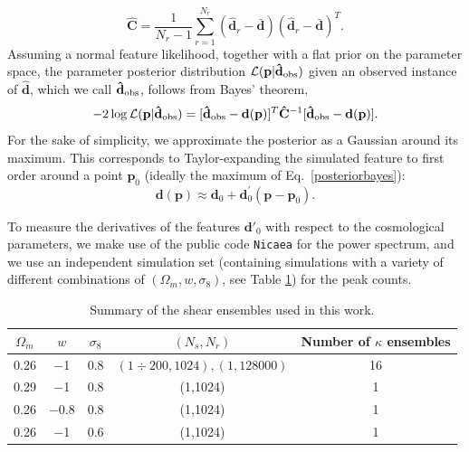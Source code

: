 \documentclass[reprint,aps,prd,superscriptaddress,showkeys,showpacs]{revtex4-1}
\newcommand{\bb}[1]{\mathbf{#1}}
\newcommand{\bbh}[1]{\mathbf{\hat{#1}}}
\begin{document}
\begin{equation}
\label{covest}
\bbh{C} = \frac{1}{N_r-1}\sum_{r=1}^{N_r} (\bbh{d}_r - \bar{\bb{d}}) (\bbh{d}_r - \bar{\bb{d}})^T.
\end{equation}
%
Assuming a normal feature likelihood, together with a flat prior on
the parameter space, the parameter posterior distribution
$\mathcal{L}(\bb{p}\vert\bbh{d}_{\rm obs})$ given an observed instance of
$\bbh{d}$, which we call $\bbh{d}_{\rm obs}$, follows from Bayes' theorem,
%
\begin{equation}
\label{posteriorbayes}
-2\log\mathcal{L}(\bb{p}\vert\bbh{d}_{\rm obs}) = [\bbh{d}_{\rm obs}-\bb{d}(\bb{p})]^T\bbh{C}^{-1}[\bbh{d}_{\rm obs}-\bb{d}(\bb{p})].
\end{equation}
%
For the sake of simplicity, we approximate the posterior as a Gaussian
around its maximum. This corresponds to Taylor-expanding the simulated
feature to first order around a point $\bb{p}_0$ (ideally the maximum
of Eq.~\ref{posteriorbayes}):
%
\begin{equation}
\bb{d}(\bb{p}) \approx \bb{d}_0 + \bb{d}_0^\prime(\bb{p}-\bb{p}_0).
\end{equation}
%

To measure the derivatives of the features $\bb{d}'_0$ with respect to
the cosmological parameters, we make use of the public code
\texttt{Nicaea} \citep{Nicaea} for the power spectrum, and we use an
independent simulation set (containing simulations with a variety of
different combinations of $(\Omega_m,w,\sigma_8)$, see Table
\ref{simtable}) for the peak counts.

\begin{table}
\begin{center}
\begin{tabular}{c|c|c||c|c}
\toprule
$\Omega_m$ &  $w$ & $\sigma_8$ & $(N_s,N_r)$ & Number of $\kappa$ ensembles \\ \hline \hline
\midrule
%
0.26 & $-$1 & 0.8 & $(1\div200,1024),(1,128000)$ & 16 \\
0.29 & $-$1 & 0.8 & (1,1024) & 1 \\
0.26 & $-$0.8 & 0.8 & (1,1024) & 1 \\
0.26 & $-$1 & 0.6 & (1,1024) & 1 \\
%
\bottomrule
\end{tabular}
\end{center}
\caption{Summary of the shear ensembles used in this work.}
\label{simtable}
\end{table}
\end{document}
